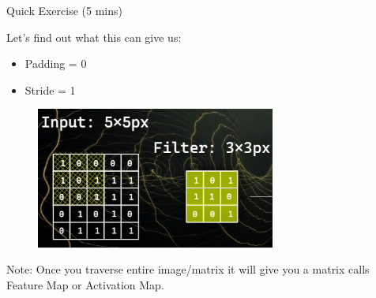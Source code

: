 \begin{frame}{Quick Exercise (5 mins)}
    \begin{block}{Let’s find out what this can give us:}
        \begin{itemize}
            \item Padding = 0
            \item Stride = 1
        \end{itemize}
    \end{block}
    \begin{figure}
    \centering
    \includegraphics[width=0.7\textwidth,height=0.7\textheight,keepaspectratio]{images/cnn/cnn-exercise-1.png}
    \end{figure}

    Note: Once you traverse entire image/matrix it will give you a matrix calls Feature Map or Activation Map.
\end{frame}